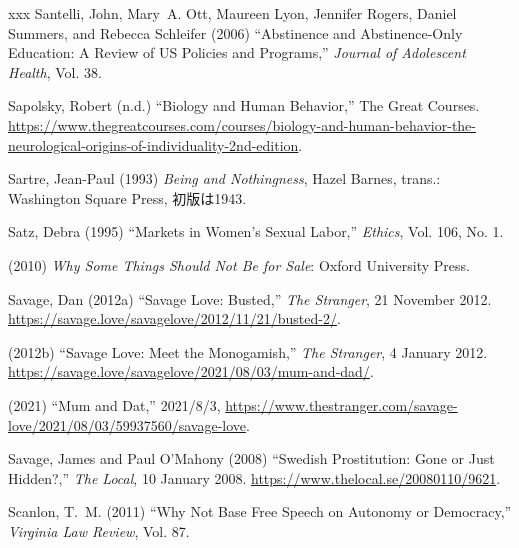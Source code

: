 \documentclass[]{jlreq} \usepackage{mystyle}
\begin{document}
\begin{thebibliography}{xxx}
Santelli, John, Mary~A. Ott, Maureen Lyon, Jennifer Rogers, Daniel Summers, and
  Rebecca Schleifer (2006) ``Abstinence and Abstinence-Only Education: A Review
  of US Policies and Programs,'' \textit{ Journal of Adolescent Health}, Vol.
  38.

Sapolsky, Robert (n.d.) ``Biology and Human Behavior,'' The Great Courses.
  \url{https://www.thegreatcourses.com/courses/biology-and-human-behavior-the-neurological-origins-of-individuality-2nd-edition}.

Sartre, Jean-Paul (1993)  \textit{ Being and Nothingness}, Hazel Barnes,
  trans.: Washington Square Press, 初版は1943.

Satz, Debra (1995) ``Markets in Women's Sexual Labor,'' \textit{ Ethics}, Vol.
  106, No. 1.

 \bysame{}  (2010)  \textit{ Why Some Things Should Not Be for Sale}: Oxford
  University Press.

Savage, Dan (2012a) ``Savage Love: Busted,'' \emph{The Stranger}, 21 November
  2012. \url{https://savage.love/savagelove/2012/11/21/busted-2/}.

 \bysame{}  (2012b) ``Savage Love: Meet the Monogamish,'' \emph{The Stranger},
  4 January 2012. \url{https://savage.love/savagelove/2021/08/03/mum-and-dad/}.

 \bysame{}  (2021) ``Mum and Dat,'' 2021/8/3,
  \url{https://www.thestranger.com/savage-love/2021/08/03/59937560/savage-love}.

Savage, James and Paul O'Mahony (2008) ``Swedish Prostitution: Gone or Just
  Hidden?,'' \emph{The Local}, 10 January 2008.
  \url{https://www.thelocal.se/20080110/9621}.

Scanlon, T.~M. (2011) ``Why Not Base Free Speech on Autonomy or Democracy,''
  \textit{ Virginia Law Review}, Vol. 87.


\end{thebibliography}
\end{document}
